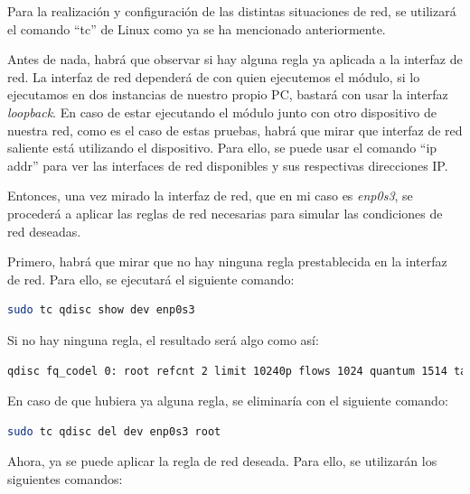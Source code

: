 \newpage

Para la realización y configuración de las distintas situaciones de red, se utilizará el comando ``tc'' de Linux como ya se ha mencionado anteriormente. 
\vspace{\baselineskip}

Antes de nada, habrá que observar si hay alguna regla ya aplicada a la interfaz de red. La interfaz de red dependerá de con quien ejecutemos el módulo, si lo ejecutamos en dos instancias de nuestro propio PC, bastará con usar la interfaz \textit{loopback}. En caso de estar ejecutando el módulo junto con otro dispositivo de nuestra red, como es el caso de estas pruebas, habrá que mirar que interfaz de red saliente está utilizando el dispositivo. Para ello, se puede usar el comando ``ip addr'' para ver las interfaces de red disponibles y sus respectivas direcciones IP. 

\vspace{\baselineskip}
Entonces, una vez mirado la interfaz de red, que en mi caso es \textit{enp0s3}, se procederá a aplicar las reglas de red necesarias para simular las condiciones de red deseadas.

\vspace{\baselineskip}

Primero, habrá que mirar que no hay ninguna regla prestablecida en la interfaz de red. Para ello, se ejecutará el siguiente comando:
\begin{lstlisting}[language=bash]
sudo tc qdisc show dev enp0s3
\end{lstlisting}
Si no hay ninguna regla, el resultado será algo como así:
\begin{lstlisting}[language=bash, breaklines=true]
qdisc fq_codel 0: root refcnt 2 limit 10240p flows 1024 quantum 1514 target 5ms interval 100ms memory_limit 32Mb ecn drop_batch 64 
\end{lstlisting}

En caso de que hubiera ya alguna regla, se eliminaría con el siguiente comando:
\begin{lstlisting}[language=bash]
sudo tc qdisc del dev enp0s3 root
\end{lstlisting}

Ahora, ya se puede aplicar la regla de red deseada. Para ello, se utilizarán los siguientes comandos:

